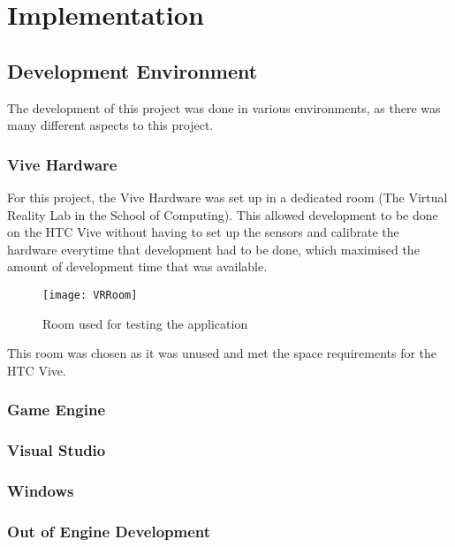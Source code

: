 \chapter{Implementation}
\label{chapter6}

\section{Development Environment}
The development of this project was done in various environments, as there was many different aspects to this project.

\subsection{Vive Hardware}
	For this project, the Vive Hardware was set up in a dedicated room (The Virtual Reality Lab in the School of Computing). This allowed development to be done on the HTC Vive without having to set up the sensors and calibrate the hardware everytime that development had to be done, which maximised the amount of development time that was available.\\

\begin{figure}[H]
	\texttt{[image: VRRoom]}
	\centering
	\caption{Room used for testing the application}
	\label{fig:VRRoom}
\end{figure}

	This room was chosen as it was unused and met the space requirements for the HTC Vive.

\subsection{Game Engine}
\lipsum[1-1] \cite{parikh1980adaptive}

\subsection{Visual Studio}

\subsection{Windows}

\subsection{Out of Engine Development}
\lipsum[1-1] \cite{parikh1980adaptive}

